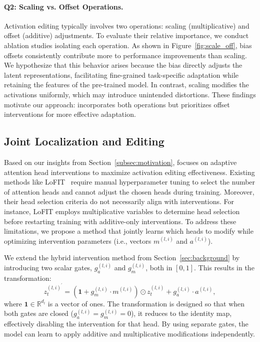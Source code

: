 

\paragraph{Q2: Scaling vs. Offset Operations.} 
Activation editing typically involves two operations: scaling (multiplicative) and offset (additive) adjustments.
To evaluate their relative importance, we conduct ablation studies isolating each operation.
As shown in Figure~\ref{fig:scale_off}, bias offsets consistently contribute more to performance improvements than scaling.
We hypothesize that this behavior arises because the bias directly adjusts the latent representations, facilitating fine-grained task-specific adaptation while retaining the features of the pre-trained model.
In contrast, scaling modifies the activations uniformly, which may introduce unintended distortions.
These findings motivate our approach: \jola{} incorporates both operations but prioritizes offset interventions for more effective adaptation.

\subsection{Joint Localization and Editing}
\label{subsec:localize}
Based on our insights from Section~\ref{subsec:motivation}, \jola{} focuses on adaptive attention head interventions to maximize activation editing effectiveness.
Existing methods like LoFIT~\cite{yin2024lofit} require manual hyperparameter tuning to select the number of attention heads and cannot adjust the chosen heads during training. Moreover, their head selection criteria do not necessarily align with interventions. For instance, LoFIT employs multiplicative variables to determine head selection before restarting training with additive-only interventions. To address these limitations, we propose a method that jointly learns which heads to modify while optimizing intervention parameters (i.e., vectors $m^{(l,i)}$ and $a^{(l,i)}$). 

We extend the hybrid intervention method from Section~\ref{sec:background} by introducing two scalar gates, \( g_{a}^{(l,i)} \) and \( g_{m}^{(l,i)} \), both in \([0,1]\). This results in the transformation:
\begin{equation}  
    \label{eq:gate_editing}  
    z_t^{(l,i)^{\prime}} =  (\mathbf{1} + g_{m}^{(l,i)} \cdot m^{(l,i)}) \odot z_{t}^{(l,i)} + g_{a}^{(l,i)} \cdot a^{(l,i)},  
\end{equation} 
where \( \mathbf{1} \in \mathbb{R}^{d_l} \) is a vector of ones. The transformation is designed so that when both gates are closed ($g_{a}^{(l,i)} = g_{m}^{(l,i)} = 0$), it reduces to the identity map, effectively disabling the intervention for that head. By using separate gates, the model can learn to apply additive and multiplicative modifications independently.

